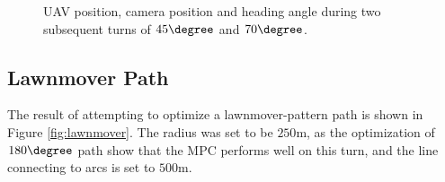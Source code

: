 \begin{figure}
	\caption{UAV position, camera position and heading angle during two subsequent turns of $45\degree$ and $70\degree$.}
	\label{fig:paths_cur_150m}
\end{figure}


\subsection{Lawnmover Path}

The result of attempting to optimize a lawnmover-pattern path is shown in Figure \ref{fig:lawnmover}. The radius was set to be $250$m, as the optimization of $180\degree$ path show that the MPC performs well on this turn, and the line connecting to arcs is set to $500$m.


